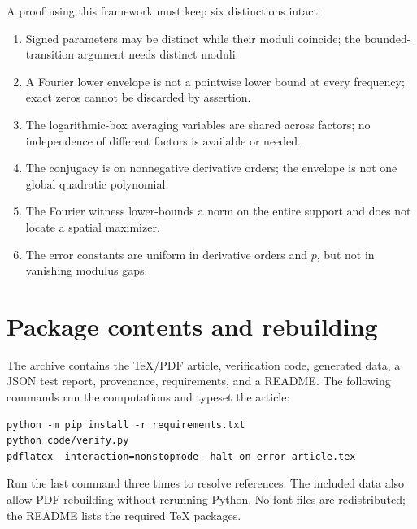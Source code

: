 \documentclass[11pt,a4paper]{article}
\numberwithin{equation}{section}
\theoremstyle{definition}
\theoremstyle{remark}\newtheorem{remark}[theorem]{Remark}
\begin{document}
A proof using this framework must keep six distinctions intact:
\begin{enumerate}[leftmargin=2em,label=\arabic*.,noitemsep,parsep=0pt]
 \item Signed parameters may be distinct while their moduli coincide;
       the bounded-transition argument needs distinct moduli.
 \item A Fourier lower envelope is not a pointwise lower bound at every
       frequency; exact zeros cannot be discarded by assertion.
 \item The logarithmic-box averaging variables are shared across factors;
       no independence of different factors is available or needed.
 \item The conjugacy is on nonnegative derivative orders; the envelope is
       not one global quadratic polynomial.
 \item The Fourier witness lower-bounds a norm on the entire support and
       does not locate a spatial maximizer.
 \item The error constants are uniform in derivative orders and $p$, but
       not in vanishing modulus gaps.
\end{enumerate}

\section{Package contents and rebuilding}

The archive contains the TeX/PDF article, verification code, generated data,
a JSON test report, provenance, requirements, and a README. The following
commands run the computations and typeset the article:
\begin{verbatim}
python -m pip install -r requirements.txt
python code/verify.py
pdflatex -interaction=nonstopmode -halt-on-error article.tex
\end{verbatim}
Run the last command three times to resolve references. The included data
also allow PDF rebuilding without rerunning Python. No font files are
redistributed; the README lists the required TeX packages.
\end{document}
